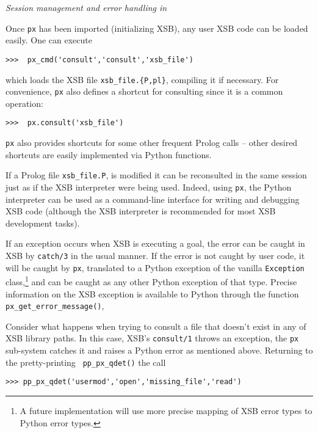 \begin{example} \rm {\it Session management and error handling in \px}

  Once {\tt px} has been imported (initializing XSB), any user XSB
  code can be loaded easily.  One can execute
  
\begin{verbatim}
>>>  px_cmd('consult','consult','xsb_file')
\end{verbatim}

\noindent
which loads the XSB file {\tt xsb\_file.\{P,pl\}}, compiling it if
necessary.  For convenience, {\tt px} also defines a shortcut for
consulting since it is a common operation:

\begin{verbatim}
>>>  px.consult('xsb_file')
\end{verbatim}

\noindent
{\tt px} also provides shortcuts for some other frequent Prolog calls
-- other desired shortcuts are easily implemented via Python
functions.

If a Prolog file {\tt xsb\_file.P}, is modified it can be reconsulted
in the same session just as if the XSB interpreter were being used.
Indeed, using {\tt px}, the Python interpreter can be used as a
command-line interface for writing and debugging XSB code (although
the XSB interpreter is recommended for most XSB development tasks).

If an exception occurs when XSB is executing a goal, the error can be
caught in XSB by {\tt catch/3} in the usual manner.  If the error is
not caught by user code, it will be caught by {\tt px}, translated to
a Python exception of the vanilla {\tt Exception} class,\footnote{A
  future implementation will use more precise mapping of XSB error
  types to Python error types.}  and can be caught as any other Python
exception of that type.  Precise information on the XSB exception is
available to Python through the \px{} function {\tt
  px\_get\_error\_message()},

Consider what happens when trying to consult a file that doesn't exist
in any of XSB library paths.  In this case, XSB's {\tt consult/1}
throws an exception, the {\tt px} sub-system catches it and raises a
Python error as mentioned above.  Returning to the pretty-printing {\tt
  pp\_px\_qdet()} the call

\begin{verbatim}
>>> pp_px_qdet('usermod','open','missing_file','read')
\end{verbatim}


\end{example}
